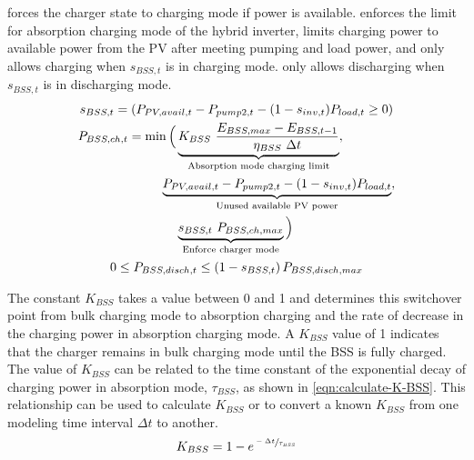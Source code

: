  forces the charger state to charging mode if power is available.
 enforces the limit for absorption charging mode of the hybrid inverter,
limits charging power to available power from the PV after meeting pumping and load power,
and only allows charging when $s_{BSS,t}$ is in charging mode.
 only allows discharging when $s_{BSS,t}$ is in discharging mode.
%
\begin{gather}
\label{eqn:sBSS}
s_{BSS,t} = \left( P_{PV,avail,t} - P_{pump2,t} - (1 - s_{inv,t}) P_{load,t} \ge 0 \right)
\\
\label{eqn:BSS-mode-charging}
\begin{aligned}
P_{BSS,ch,t} = \min\Big(
& \underbrace{K_{BSS} \ \frac{E_{BSS,max} - E_{BSS,t-1}}{\eta_{BSS} \ \Delta t}}_
{\textrm{Absorption mode charging limit}},
\\
& \mkern-22mu \underbrace{P_{PV,avail,t} - P_{pump2,t} - (1 - s_{inv,t}) P_{load,t}}_
{\textrm{Unused available PV power}},
\\
& \underbrace{s_{BSS,t} \ P_{BSS,ch,max}}_  
{\textrm{Enforce charger mode}} \Big)
\end{aligned}
\\
\label{eqn:BSS-mode-discharging}
0 \le P_{BSS,disch,t} \le \left(1 - s_{BSS,t}\right) P_{BSS,disch,max}
\end{gather}

The constant $K_{BSS}$ takes a value between 0 and 1 and determines this switchover point from bulk charging mode to absorption charging and the rate of decrease in the charging power in absorption charging mode. A $K_{BSS}$ value of 1 indicates that the charger remains in bulk charging mode until the BSS is fully charged. The value of $K_{BSS}$ can be related to the time constant of the exponential decay of charging power in absorption mode, $\tau_{BSS}$, as shown in \cref{eqn:calculate-K-BSS}. This relationship can be used to calculate $K_{BSS}$ or to convert a known $K_{BSS}$ from one modeling time interval $\Delta t$ to another.
%
\begin{equation}
\label{eqn:calculate-K-BSS}
K_{BSS} = 1 - e^{\sfrac{-\Delta t}{\tau_{BSS}}}
\end{equation}

